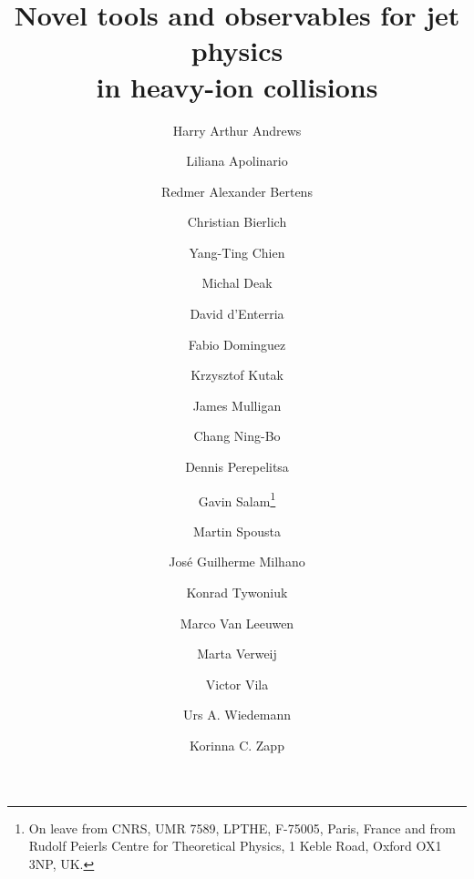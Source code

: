 \documentclass{article}
\begin{document}
\title{Novel tools and observables for jet physics \\ in heavy-ion collisions}
%
\author[bir]{Harry Arthur Andrews}
\author[lip,ist]{Liliana Apolinario}
\author[ten]{Redmer Alexander Bertens}
\author[lund,bohr]{Christian Bierlich}
\author[mit]{Yang-Ting Chien}
\author[ifj]{Michal Deak}
\author[cern]{David d'Enterria}
\author[igf]{Fabio Dominguez}
\author[ifj]{Krzysztof Kutak}
\author[yal]{James Mulligan}
\author[itp]{Chang Ning-Bo}
\author[col]{Dennis Perepelitsa}
\author[cern]{Gavin Salam\footnote{On leave from CNRS, UMR 7589, LPTHE, F-75005, Paris, France and from Rudolf Peierls Centre for Theoretical Physics, 1 Keble Road, Oxford OX1 3NP, UK.}}
\author[char]{Martin Spousta}
\author[lip,ist,cern]{Jos\'e Guilherme Milhano}
\author[cern]{Konrad Tywoniuk}
\author[nik]{Marco Van Leeuwen}
\author[van]{Marta Verweij}
\author[igf]{Victor Vila}
\author[cern]{Urs A. Wiedemann}
\author[lip,cern]{Korinna C. Zapp}
%
\end{document}
